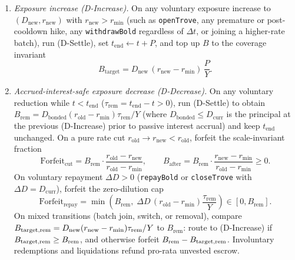 \begin{theorem}
\begin{enumerate}[label=(\roman*), leftmargin=2.2em, itemsep=2pt]
\begin{enumerate}[label=(\alph*), leftmargin=1.8em, itemsep=2pt]
\item \emph{Exposure increase \textup{(D-Increase)}.} On any voluntary exposure increase to $(D_{\mathrm{new}}, r_{\mathrm{new}})$ with $r_{\mathrm{new}} > r_{\min}$ (such as \texttt{openTrove}, any premature or post-cooldown hike, any \texttt{withdrawBold} regardless of $\Delta t$, or joining a higher-rate batch), run \textup{(D-Settle)}, set $t_{\mathrm{end}} \leftarrow t + P$, and top up $B$ to the coverage invariant
\begin{equation}\label{eq:designD_target}
B_{\mathrm{target}} = D_{\mathrm{new}}\,(r_{\mathrm{new}} - r_{\min})\,\frac{P}{Y}.
\end{equation}
\item \emph{Accrued-interest-safe exposure decrease \textup{(D-Decrease)}.} On any voluntary reduction while $t < t_{\mathrm{end}}$ ($\tau_{\mathrm{rem}} = t_{\mathrm{end}} - t > 0$), run \textup{(D-Settle)} to obtain $B_{\mathrm{rem}} = D_{\mathrm{bonded}}(r_{\mathrm{old}} - r_{\min})\tau_{\mathrm{rem}}/Y$ (where $D_{\mathrm{bonded}} \le D_{\mathrm{curr}}$ is the principal at the previous \textup{(D-Increase)} prior to passive interest accrual) and keep $t_{\mathrm{end}}$ unchanged. On a pure rate cut $r_{\mathrm{old}} \to r_{\mathrm{new}} < r_{\mathrm{old}}$, forfeit the scale-invariant fraction
\begin{equation}\label{eq:designD_cut}
\mathrm{Forfeit}_{\mathrm{cut}} = B_{\mathrm{rem}}\cdot \frac{r_{\mathrm{old}} - r_{\mathrm{new}}}{r_{\mathrm{old}} - r_{\min}}, \qquad B_{\mathrm{after}} = B_{\mathrm{rem}}\cdot \frac{r_{\mathrm{new}} - r_{\min}}{r_{\mathrm{old}} - r_{\min}} \ge 0.
\end{equation}
On voluntary repayment $\Delta D > 0$ (\texttt{repayBold} or \texttt{closeTrove} with $\Delta D = D_{\mathrm{curr}}$), forfeit the zero-dilution cap
\begin{equation}\label{eq:designD_repay}
\mathrm{Forfeit}_{\mathrm{repay}} = \min\!\left(B_{\mathrm{rem}},\; \Delta D\,(r_{\mathrm{old}} - r_{\min})\frac{\tau_{\mathrm{rem}}}{Y}\right) \in [0, B_{\mathrm{rem}}].
\end{equation}
On mixed transitions (batch join, switch, or removal), compare $B_{\textup{target,rem}} = D_{\mathrm{new}}(r_{\mathrm{new}} - r_{\min})\tau_{\mathrm{rem}}/Y$ to $B_{\mathrm{rem}}$: route to \textup{(D-Increase)} if $B_{\textup{target,rem}} \ge B_{\mathrm{rem}}$, and otherwise forfeit $B_{\mathrm{rem}} - B_{\textup{target,rem}}$. Involuntary redemptions and liquidations refund pro-rata unvested escrow.
\end{enumerate}

\end{enumerate}
\end{theorem}
